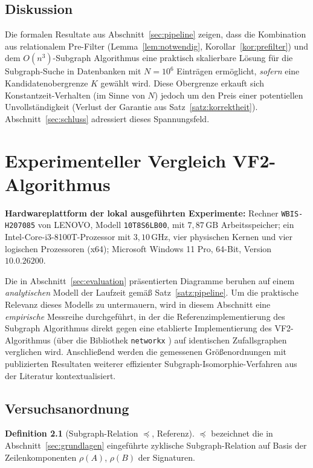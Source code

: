 \documentclass[a4paper,12pt, twoside]{report}
\newcommand{\experimenthardware}{%
	\par\smallskip\noindent
	\textbf{Hardwareplattform der lokal ausgeführten Experimente:} Rechner \texttt{WBIS-H207085} von LENOVO, Modell \texttt{10T8S6LB00}, mit $7{,}87\,\mathrm{GB}$ Arbeitsspeicher; ein Intel-Core-i3-8100T-Prozessor mit $3{,}10\,\mathrm{GHz}$, vier physischen Kernen und vier logischen Prozessoren (x64); Microsoft Windows 11 Pro, 64-Bit, Version $10.0.26200$.
	\par\smallskip}
\theoremstyle{definition}
\newtheorem{definition}{Definition}
\begin{document}
\section{Diskussion}

Die formalen Resultate aus Abschnitt~\ref{sec:pipeline} zeigen, dass die Kombination aus relationalem Pre-Filter (Lemma~\ref{lem:notwendig}, Korollar~\ref{kor:prefilter}) und dem $O(n^3)$-Subgraph Algorithmus \cite{epp2026subgraph} eine praktisch skalierbare Lösung für die Subgraph-Suche in Datenbanken mit $N=10^6$ Einträgen ermöglicht, \emph{sofern} eine Kandidatenobergrenze $K$ gewählt wird. Diese Obergrenze erkauft sich Konstantzeit-Verhalten (im Sinne von $N$) jedoch um den Preis einer potentiellen Unvollständigkeit (Verlust der Garantie aus Satz~\ref{satz:korrektheit}). Abschnitt~\ref{sec:schluss} adressiert dieses Spannungsfeld.

\chapter{Experimenteller Vergleich VF2-Algorithmus}
\label{sec:vergleich}

\experimenthardware

Die in Abschnitt~\ref{sec:evaluation} präsentierten Diagramme beruhen auf einem \emph{analytischen} Modell der Laufzeit gemäß Satz~\ref{satz:pipeline}. Um die praktische Relevanz dieses Modells zu untermauern, wird in diesem Abschnitt eine \emph{empirische} Messreihe durchgeführt, in der die Referenzimplementierung des Subgraph Algorithmus \cite{epp2026subgraph} direkt gegen eine etablierte Implementierung des VF2-Algorithmus \cite{cordella2004} (über die Bibliothek \texttt{networkx} \cite{networkx}) auf identischen Zufallsgraphen verglichen wird. Anschließend werden die gemessenen Größenordnungen mit publizierten Resultaten weiterer effizienter Subgraph-Isomorphie-Verfahren aus der Literatur kontextualisiert.

\section{Versuchsanordnung}

\begin{definition}[Subgraph-Relation $\preceq$, Referenz]
	\label{def:subgraphrelation_ref}
	$\preceq$ bezeichnet die in Abschnitt~\ref{sec:grundlagen} eingeführte zyklische Subgraph-Relation auf Basis der Zeilenkomponenten $\rho(A)$, $\rho(B)$ der Signaturen.
\end{definition}
\end{document}
